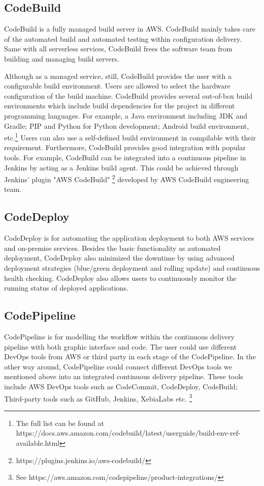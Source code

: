 \subsection{CodeBuild}
CodeBuild is a fully managed build server in AWS. CodeBuild mainly takes care of the automated build and automated testing within configuration delivery. Same with all serverless services, CodeBuild frees the software team from building and managing build servers.
\par
Although as a managed service, still, CodeBuild provides the user with a configurable build environment. Users are allowed to select the hardware configuration of the build machine. CodeBuild provides several out-of-box build environments which include build dependencies for the project in different programming languages. For example, a Java environment including JDK and Gradle; PIP and Python for Python development; Android build environment, etc.\footnote{The full list can be found at https://docs.aws.amazon.com/codebuild/latest/userguide/build-env-ref-available.html} Users can also use a self-defined build environment in compilable with their requirement.
Furthermore, CodeBuild provides good integration with popular tools. For example, CodeBuild can be integrated into a continuous pipeline in Jenkins by acting as a Jenkins build agent. This could be achieved through Jenkins' plugin "AWS CodeBuild" \footnote{https://plugins.jenkins.io/aws-codebuild/} developed by AWS CodeBuild engineering team.
\subsection{CodeDeploy}
CodeDeploy is for automating the application deployment to both AWS services and on-premise services. 
Besides the basic functionality as automated deployment, CodeDeploy also minimized the downtime by using advanced deployment strategies (blue/green deployment and rolling update) and continuous health checking. 
CodeDeploy also allows users to continuously monitor the running status of deployed applications.
\subsection{CodePipeline}
CodePipeline is for modelling the workflow within the continuous delivery pipeline with both graphic interface and code. The user could use different DevOps tools from AWS or third party in each stage of the CodePipeline. In the other way around, CodePipeline could connect different DevOps tools we mentioned above into an integrated continuous delivery pipeline. These tools include AWS DevOps tools such as CodeCommit, CodeDeploy, CodeBuild; Third-party tools such as GitHub, Jenkins, XebiaLabs etc. \footnote{See https://aws.amazon.com/codepipeline/product-integrations/}
